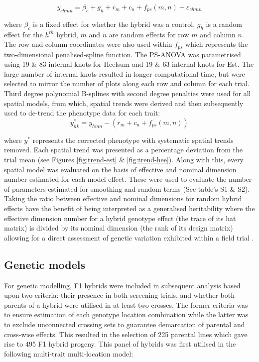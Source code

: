 \begin{equation}
y_{chmn} = \beta_c + g_h + r_m + c_n + f_{ps}(m,n) + \varepsilon_{chmn}
\label{eq:general-spline-model}
\end{equation}

where \(\beta_c\) is a fixed effect for whether the hybrid was a control, \(g_h\) is a random effect for the \(h^{th}\) hybrid, \(m\) and \(n\) are random effects for row \(m\) and column \(n\). The row and column coordinates were also used within \(f_{ps}\) which represents the two-dimensional penalised-spline function. The PS-ANOVA was parametrised using 19 \& 83 internal knots for Heelsum and 19 \& 63 internal knots for Est. The large number of internal knots resulted in longer computational time, but were selected to mirror the number of plots along each row and column for each trial. Third degree polynomial B-splines with second degree penalties were used for all spatial models, from which, spatial trends were derived and then subsequently used to de-trend the phenotype data for each trait:
\begin{equation}
y_{hk}^* = y_{hmn} - \left(r_m + c_n + f_{ps}(m,n) \right)
\label{eq:correct-values}
\end{equation}

where \(y^*\) represents the corrected phenotype with systematic spatial trends removed. Each spatial trend was presented as a percentage deviation from the trial mean (see Figures \ref{fig:trend-est} \& \ref{fig:trend-hee}). Along with this, every spatial model was evaluated on the basis of effective and nominal dimension number estimated for each model effect. These were used to evaluate the number of parameters estimated for smoothing and random terms (See table's S1 \& S2). Taking the ratio between effective and nominal dimensions for random hybrid effects have the benefit of being interpreted as a generalised heritability where the effective dimension number for a hybrid genotype effect (the trace of its hat matrix) is divided by its nominal dimension (the rank of its design matrix) allowing for a direct assessment of genetic variation exhibited within a field trial \citep{Oakey2006}.

\subsection{Genetic models}\label{genetic-models}

For genetic modelling, F1 hybrids were included in subsequent analysis based upon two criteria: their presence in both screening trials, and whether both parents of a hybrid were utilised in at least two crosses. The former criteria was to ensure estimation of each genotype location combination while the latter was to exclude unconnected crossing sets to guarantee demarcation of parental and cross-wise effects. This resulted in the selection of 225 parental lines which gave rise to 495 F1 hybrid progeny. This panel of hybrids was first utilised in the following multi-trait multi-location model:


